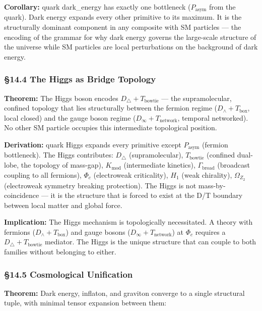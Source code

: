 \documentclass[12pt,a4paper]{article}
\newcommand{\pilcrow}{\S}
\begin{document}
\textbf{Corollary:} quark \otimes dark\_energy has exactly one bottleneck ($P_{\text{asym}}$ from the quark). Dark energy expands every other primitive to its maximum. It is the structurally dominant component in any composite with SM particles --- the encoding of the grammar for why dark energy governs the large-scale structure of the universe while SM particles are local perturbations on the background of dark energy.

\subsubsection{\pilcrow{}14.4 The Higgs as Bridge Topology}

\textbf{Theorem:} The Higgs boson encodes $D_{\triangle} + T_{\text{bowtie}}$ --- the supramolecular, confined topology that lies structurally between the fermion regime ($D_{\wedge} + T_{\text{box}}$, local closed) and the gauge boson regime ($D_{\infty} + T_{\text{network}}$, temporal networked). No other SM particle occupies this intermediate topological position.

\textbf{Derivation:} quark \otimes Higgs expands every primitive except $P_{\text{asym}}$ (fermion bottleneck). The Higgs contributes: $D_{\triangle}$ (supramolecular), $T_{\text{bowtie}}$ (confined dual-lobe, the topology of mass-gap), $K_{\text{mod}}$ (intermediate kinetics), $\Gamma_{\text{broad}}$ (broadcast coupling to all fermions), $\Phi_c$ (electroweak criticality), $H_1$ (weak chirality), $\Omega_{Z_2}$ (electroweak symmetry breaking protection). The Higgs is not mass-by-coincidence --- it is the structure that is forced to exist at the D/T boundary between local matter and global force.

\textbf{Implication:} The Higgs mechanism is topologically necessitated. A theory with fermions ($D_{\wedge} + T_{\text{box}}$) and gauge bosons ($D_{\infty} + T_{\text{network}}$) at $\Phi_c$ requires a $D_{\triangle} + T_{\text{bowtie}}$ mediator. The Higgs is the unique structure that can couple to both families without belonging to either.

\subsubsection{\pilcrow{}14.5 Cosmological Unification}

\textbf{Theorem:} Dark energy, inflaton, and graviton converge to a single structural tuple, with minimal tensor expansion between them:
\end{document}
